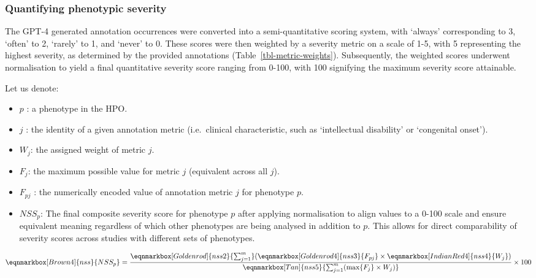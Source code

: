 \documentclass[
]{agujournal2019}
\begin{document}
\subsubsection{Quantifying phenotypic
severity}\label{quantifying-phenotypic-severity-1}

The GPT-4 generated annotation occurrences were converted into a
semi-quantitative scoring system, with `always' corresponding to 3,
`often' to 2, `rarely' to 1, and `never' to 0. These scores were then
weighted by a severity metric on a scale of 1-5, with 5 representing the
highest severity, as determined by the provided annotations
(Table~\ref{tbl-metric-weights}). Subsequently, the weighted scores
underwent normalisation to yield a final quantitative severity score
ranging from 0-100, with 100 signifying the maximum severity score
attainable.

Let us denote:

\begin{itemize}
\item
  \(p\) : a phenotype in the HPO.
\item
  \(j\) : the identity of a given annotation metric (i.e.~clinical
  characteristic, such as `intellectual disability' or `congenital
  onset').
\item
  \(W_j\): the assigned weight of metric \(j\).
\item
  \(F_j\): the maximum possible value for metric \(j\) (equivalent
  across all \(j\)).
\item
  \(F_{pj}\) : the numerically encoded value of annotation metric \(j\)
  for phenotype \(p\).
\item
  \(NSS_p\): The final composite severity score for phenotype \(p\)
  after applying normalisation to align values to a 0-100 scale and
  ensure equivalent meaning regardless of which other phenotypes are
  being analysed in addition to \(p\). This allows for direct
  comparability of severity scores across studies with different sets of
  phenotypes.
\end{itemize}

\hfill\break
\hfill\break

\begin{equation*}
  \eqnmarkbox[Brown4]{nss}{NSS_p}
  =
  \frac{ 
    \eqnmarkbox[Goldenrod]{nss2}{\sum_{j=1}^{m}} 
    (
      \eqnmarkbox[Goldenrod4]{nss3}{F_{pj}}
      \times 
      \eqnmarkbox[IndianRed4]{nss4}{W_j}
    )
    }{
    \eqnmarkbox[Tan]{nss5}{\sum_{j=1}^{m}(\max\{F_j\} \times W_j)} 
  } \times 100
\end{equation*}
\end{document}
